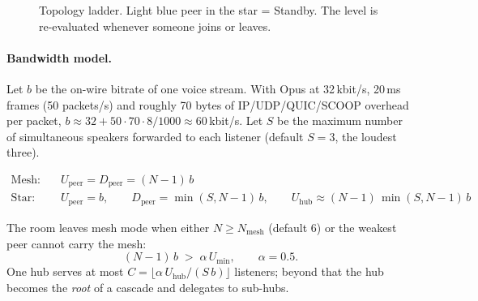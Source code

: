 \documentclass[11pt,a4paper]{article}
\newcommand{\SCOOP}{\textsf{SCOOP}}
\begin{document}
\begin{figure}[ht]
\caption{Topology ladder. Light blue peer in the star = Standby. The level is
re-evaluated whenever someone joins or leaves.}
\label{fig:ladder}
\end{figure}

\paragraph{Bandwidth model.} Let $b$ be the on-wire bitrate of one voice stream. With
Opus at 32\,kbit/s, 20\,ms frames (50 packets/s) and roughly 70 bytes of IP/UDP/QUIC/\SCOOP{}
overhead per packet, $b \approx 32 + 50\cdot 70\cdot 8/1000 \approx 60$\,kbit/s. Let $S$ be the
maximum number of simultaneous speakers forwarded to each listener (default $S=3$, the
loudest three).

\begin{align}
\text{Mesh:}\quad & U_{\text{peer}} = D_{\text{peer}} = (N-1)\,b \\
\text{Star:}\quad & U_{\text{peer}} = b, \qquad D_{\text{peer}} = \min(S, N-1)\,b, \qquad
                    U_{\text{hub}} \approx (N-1)\,\min(S, N-1)\,b
\end{align}

The room leaves mesh mode when either $N \ge N_{\text{mesh}}$ (default 6) or the weakest
peer cannot carry the mesh:
\begin{equation}
  (N-1)\,b \;>\; \alpha \, U_{\min}, \qquad \alpha = 0.5 .
\end{equation}
One hub serves at most $C = \lfloor \alpha\,U_{\text{hub}} / (S\,b) \rfloor$ listeners; beyond
that the hub becomes the \emph{root} of a cascade and delegates to sub-hubs.
\end{document}

